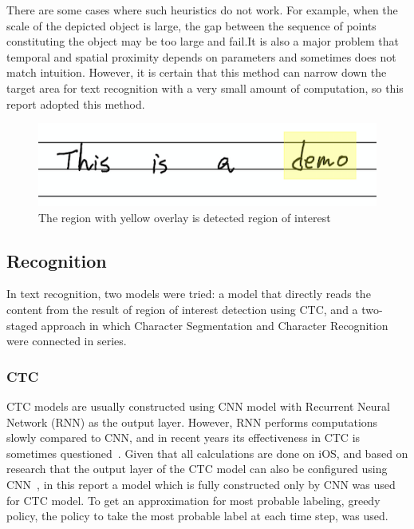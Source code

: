 There are some cases where such heuristics do not work. For example, when the scale of
the depicted object is large, the gap between the sequence of points
constituting the object may be too large and fail.It is also a major problem that
temporal and spatial proximity depends on parameters and sometimes does not match intuition.
However, it is certain that this method can narrow down the target area for text recognition
with a very small amount of computation, so this report adopted this method.

\begin{figure}
    \centering
    \includegraphics[width=\linewidth]{images/region_of_interest.png}
    \caption{The region with yellow overlay is detected region of interest}
    \label{fig:region_of_interest}
\end{figure}

\subsection{Recognition}

In text recognition, two models were tried: a model that directly reads the content from the
result of region of interest detection using CTC, and a two-staged approach in which
Character Segmentation and Character Recognition were connected in series.

\subsubsection{CTC}

CTC models are usually constructed using CNN model with Recurrent Neural Network (RNN)
as the output layer.
However, RNN performs computations slowly compared to CNN,
and in recent years its effectiveness in CTC is sometimes questioned~\cite{puigcerver2017multidimensional}.
Given that all calculations are done on iOS, and based on research that the
output layer of the CTC model can also be configured using CNN~\cite{gao2017reading}, in this report
a model which is fully constructed only by CNN was used for CTC model.
To get an approximation for most probable labeling, greedy policy, the policy to take the
most probable label at each time step, was used.

